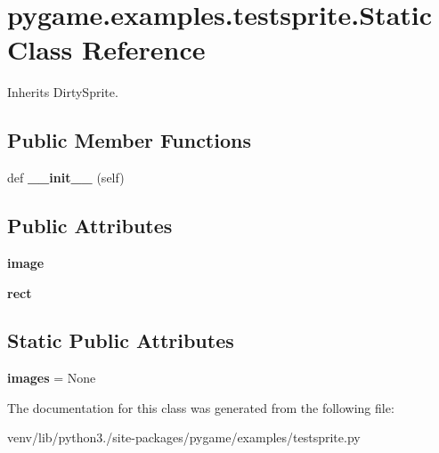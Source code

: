 \hypertarget{classpygame_1_1examples_1_1testsprite_1_1_static}{}\section{pygame.\+examples.\+testsprite.\+Static Class Reference}
\label{classpygame_1_1examples_1_1testsprite_1_1_static}


Inherits Dirty\+Sprite.

\subsection*{Public Member Functions}
\begin{DoxyCompactItemize}
\item 
\mbox{\label{classpygame_1_1examples_1_1testsprite_1_1_static_a44d0d8928c0db3df372b893f99004712}} 
def {\bfseries \+\_\+\+\_\+init\+\_\+\+\_\+} (self)
\end{DoxyCompactItemize}
\subsection*{Public Attributes}
\begin{DoxyCompactItemize}
\item 
\mbox{\label{classpygame_1_1examples_1_1testsprite_1_1_static_a6eccdf232a7af32d92c8c41e9d310827}} 
{\bfseries image}
\item 
\mbox{\label{classpygame_1_1examples_1_1testsprite_1_1_static_a8627d3a61ee3a6be7291eb34f71a8639}} 
{\bfseries rect}
\end{DoxyCompactItemize}
\subsection*{Static Public Attributes}
\begin{DoxyCompactItemize}
\item 
\mbox{\label{classpygame_1_1examples_1_1testsprite_1_1_static_a575b61db267aca6aec9a929049c998da}} 
{\bfseries images} = None
\end{DoxyCompactItemize}


The documentation for this class was generated from the following file\+:\begin{DoxyCompactItemize}
\item 
venv/lib/python3./site-\/packages/pygame/examples/testsprite.\+py\end{DoxyCompactItemize}
